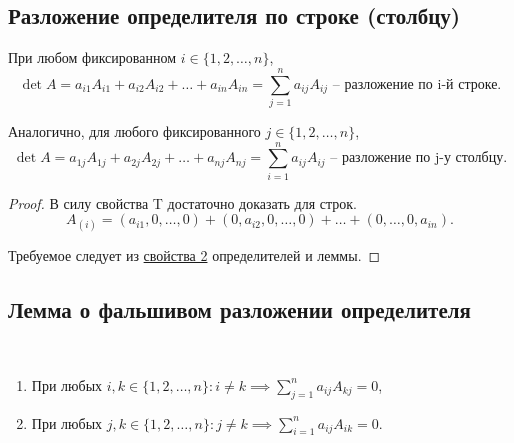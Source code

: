 \subsection{Разложение определителя по строке (столбцу)}
\begin{theorem}
    При любом фиксированном $i \in \{1, 2, \dots, n\}$,
    \begin{equation*}
        \det A = a_{i1} A_{i1} + a_{i2} A_{i2} + \dots + a_{in} A_{in} = \sum_{j = 1}^n a_{ij} A_{ij} \text{ -- разложение по i-й строке}
    .\end{equation*}

    Аналогично, для любого фиксированного $j \in \{1, 2, \dots, n\}$,
    \begin{equation*}
        \det A = a_{1j} A_{1j} + a_{2j} A_{2j} + \dots + a_{nj} A_{nj} = \sum_{i = 1}^{n} a_{ij} A_{ij} \text{ -- разложение по j-у столбцу}
    .\end{equation*}
\end{theorem}

\begin{proof}
    В силу свойства T достаточно доказать для строк.
    \begin{equation*}
        A_{(i)} = (a_{i1}, 0, \dots, 0) + (0, a_{i2}, 0, \dots, 0) + \dots + (0, \dots, 0, a_{in})
    .\end{equation*}

    Требуемое следует из \hyperref[det:prop_2]{свойства 2} определителей и леммы.
\end{proof}


\subsection{Лемма о фальшивом разложении определителя}
\begin{lemma}~
    \begin{enumerate}
    \item
        При любых $i, k \in \{1, 2, \dots, n\} : i \neq k \implies \sum_{j = 1}^n a_{ij} A_{kj} = 0$,
    \item
        При любых $j, k \in \{1, 2, \dots, n\} : j \neq k \implies \sum_{i = 1}^n a_{ij} A_{ik} = 0$.
    \end{enumerate}
\end{lemma}

